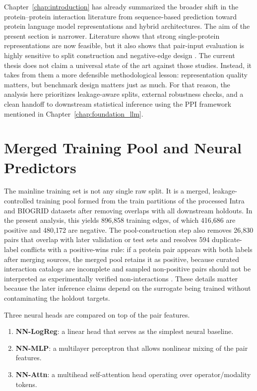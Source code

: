 Chapter~\ref{chap:introduction} has already summarized the broader shift in the protein--protein interaction literature from sequence-based prediction toward protein language model representations and hybrid architectures. The aim of the present section is narrower. Literature shows that strong single-protein representations are now feasible, but it also shows that pair-input evaluation is highly sensitive to split construction and negative-edge design \parencite{park2012, sun2017, dscript2021, lee2023, xcapt52024, bernett2024}. The current thesis does not claim a universal state of the art against those studies. Instead, it takes from them a more defensible methodological lesson: representation quality matters, but benchmark design matters just as much. For that reason, the analysis here prioritizes leakage-aware splits, external robustness checks, and a clean handoff to downstream statistical inference using the PPI framework mentioned in Chapter~\ref{chap:foundation_llm}.

\section[Training Pool and Neural Predictors]{Merged Training Pool and Neural Predictors}

The mainline training set is not any single raw split. It is a merged, leakage-controlled training pool formed from the train partitions of the processed Intra and BIOGRID datasets after removing overlaps with all downstream holdouts. In the present analysis, this yields 896{,}858 training edges, of which 416{,}686 are positive and 480{,}172 are negative. The pool-construction step also removes 26{,}830 pairs that overlap with later validation or test sets and resolves 594 duplicate-label conflicts with a positive-wins rule: if a protein pair appears with both labels after merging sources, the merged pool retains it as positive, because curated interaction catalogs are incomplete and sampled non-positive pairs should not be interpreted as experimentally verified non-interactions \parencite{park2012, luck2020, bernett2024}. These details matter because the later inference claims depend on the surrogate being trained without contaminating the holdout targets.

Three neural heads are compared on top of the pair features.
\begin{enumerate}
    \item \textbf{NN-LogReg}: a linear head that serves as the simplest neural baseline.
    \item \textbf{NN-MLP}: a multilayer perceptron that allows nonlinear mixing of the pair features.
    \item \textbf{NN-Attn}: a multihead self-attention head operating over operator/modality tokens.
\end{enumerate}

